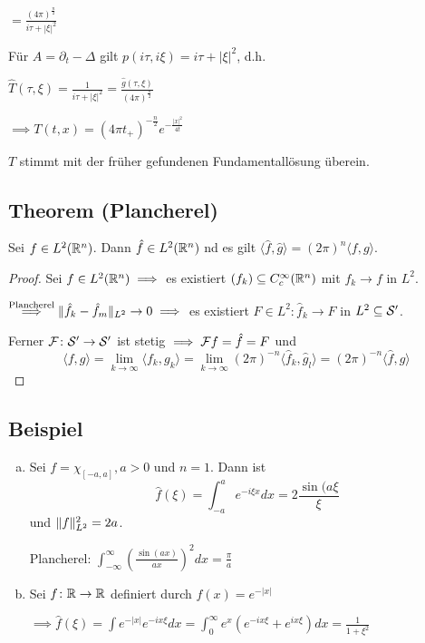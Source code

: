 $= \frac{(4\pi)^{\frac{n}{2}}}{i\tau + |\xi|^2}$

Für $A = \partial_t - \Delta$ gilt $p(i\tau, i\xi) = i\tau + |\xi|^2$, d.h.

$\hat T(\tau, \xi) = \frac{1}{i\tau + |\xi|^2} = \frac{\hat g(\tau, \xi)}{(4\pi)^{\frac{n}{2}}}$

$\implies T(t, x) = (4\pi t_+)^{-\frac{n}{2}} e^{-\frac{|x|^2}{4t}}$

\begin{bem}
  $T$ stimmt mit der früher gefundenen Fundamentallösung überein.
\end{bem}

\subsection{Theorem (Plancherel)}

Sei $f \in L^2(\mathbb{R}^n)$.
Dann $\hat f \in L^2(\mathbb{R}^n)$ nd es gilt $\langle \hat f, \hat g \rangle = (2\pi)^n \langle f, g\rangle$.

\begin{proof}
  Sei $f \in L^2(\mathbb{R}^n) \implies $ es existiert $(f_k) \subseteq C_c^\infty(\mathbb{R}^n)$ mit $f_k \to f$ in $L^2$.

  $\overset{\text{Plancherel}}{\implies} \lVert \hat f_k - \hat f_m \rVert_{L^2} \to 0 \implies $ es existiert $F \in L^2 \colon \hat f_k \to F$ in $L^2 \subseteq \mathcal{S}'$.

  Ferner $\mathcal{F} \colon \mathcal{S}' \to \mathcal{S}'$ ist stetig $\implies \mathcal{F} f = \hat f = F$ und 
  $$
  \langle f, g\rangle = \lim_{k \to \infty} \langle f_k , g_k \rangle = \lim_{k \to \infty} (2\pi)^{-n} \langle \hat f_k, \hat g_l \rangle = (2 \pi)^{-n} \langle \hat f, \hat g \rangle
  $$
\end{proof}

\subsection{Beispiel}

\begin{enumerate}[a)]
  \item Sei $f = \chi_{[-a,a]}, a  > 0$ und $n = 1$.
    Dann ist
    $$
    \hat f(\xi) = \int_{-a}^a e^{-i\xi x} dx = 2 \frac{\sin(a \xi}{\xi}
    $$
    und $\lVert f \rVert_{L^2}^2 = 2a$.

    Plancherel: $\int_{-\infty}^\infty (\frac{\sin(ax)}{ax})^2 dx = \frac{\pi}{a}$

  \item Sei $f \colon \mathbb{R} \to \mathbb{R}$ definiert durch $f(x) = e^{-|x|}$

    $\implies \hat f(\xi) = \int e^{-|x|} e^{-ix\xi} dx = \int_0^\infty e^x (e^{-ix\xi} + e^{ix\xi}) dx = \frac{1}{1 + \xi^2}$
\end{enumerate}

